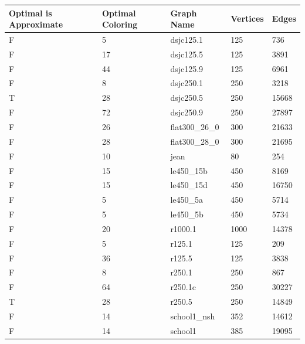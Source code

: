 \documentclass[runningheads]{llncs}
\begin{document}
\begin{longtable}{|l|l|l|l|l|}
  \hline
  \rowcolor[HTML]{F56B00}
  Optimal is Approximate & Optimal Coloring & Graph Name     & Vertices & Edges \\ \hline
  \endhead
%
  F          & 5                & dsjc125.1      & 125      & 736   \\ \hline
  F          & 17               & dsjc125.5      & 125      & 3891  \\ \hline
  F          & 44               & dsjc125.9      & 125      & 6961  \\ \hline
  F          & 8                & dsjc250.1      & 250      & 3218  \\ \hline
  T          & 28               & dsjc250.5      & 250      & 15668 \\ \hline
  F          & 72               & dsjc250.9      & 250      & 27897 \\ \hline
  F          & 26               & flat300\_26\_0 & 300      & 21633 \\ \hline
  F          & 28               & flat300\_28\_0 & 300      & 21695 \\ \hline
  F          & 10               & jean           & 80       & 254   \\ \hline
  F          & 15               & le450\_15b     & 450      & 8169  \\ \hline
  F          & 15               & le450\_15d     & 450      & 16750 \\ \hline
  F          & 5                & le450\_5a      & 450      & 5714  \\ \hline
  F          & 5                & le450\_5b      & 450      & 5734  \\ \hline
  F          & 20               & r1000.1        & 1000     & 14378 \\ \hline
  F          & 5                & r125.1         & 125      & 209   \\ \hline
  F          & 36               & r125.5         & 125      & 3838  \\ \hline
  F          & 8                & r250.1         & 250      & 867   \\ \hline
  F          & 64               & r250.1c        & 250      & 30227 \\ \hline
  T          & 28               & r250.5         & 250      & 14849 \\ \hline
  F          & 14               & school1\_nsh   & 352      & 14612 \\ \hline
  F          & 14               & school1        & 385      & 19095 \\ \hline
\end{longtable}
\end{document}

